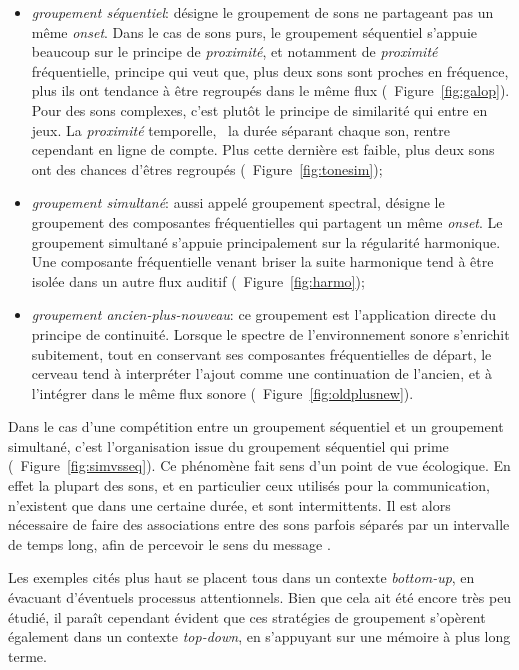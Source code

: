 {\begin{itemize}
\item \emph{groupement séquentiel}: désigne le groupement de sons ne partageant pas un même \emph{onset}. Dans le cas de sons purs, le groupement séquentiel s'appuie beaucoup sur le principe de \emph{proximité}, et notamment de \emph{proximité} fréquentielle, principe qui veut que, plus deux sons sont proches en fréquence, plus ils ont tendance à être regroupés dans le même flux (\cf~Figure~\ref{fig:galop}). Pour des sons complexes, c'est plutôt le principe de similarité qui entre en jeux. La \emph{proximité} temporelle, \ie~la durée séparant chaque son, rentre cependant en ligne de compte. Plus cette dernière est faible, plus deux sons ont des chances d'êtres regroupés (\cf~Figure~\ref{fig:tonesim});
\item \emph{groupement simultané}: aussi appelé groupement spectral, désigne le groupement des composantes fréquentielles qui partagent un même \emph{onset}. Le groupement simultané s'appuie principalement sur la régularité harmonique. Une composante fréquentielle venant briser la suite harmonique tend à être isolée dans un autre flux auditif (\cf~Figure~\ref{fig:harmo});
\item \emph{groupement ancien-plus-nouveau}: ce groupement est l'application directe du principe de continuité. Lorsque le spectre de l'environnement sonore s'enrichit subitement, tout en conservant ses composantes fréquentielles de départ, le cerveau tend à interpréter l'ajout comme une continuation de l'ancien, et à l'intégrer dans le même flux sonore (\cf~Figure~\ref{fig:oldplusnew}).
\end{itemize}

Dans le cas d'une compétition entre un groupement séquentiel et un groupement simultané, c'est l'organisation issue du groupement séquentiel qui prime (\cf~Figure~\ref{fig:simvsseq}). Ce phénomène fait sens d'un point de vue écologique. En effet la plupart des sons, et en particulier ceux utilisés pour la communication, n'existent que dans une certaine durée, et sont intermittents. Il est alors nécessaire de faire des associations entre des sons parfois séparés par un intervalle de temps long, afin de percevoir le sens du message \citep{winkler2009modeling}.

Les exemples cités plus haut se placent tous dans un contexte \emph{bottom-up}, en évacuant d'éventuels processus attentionnels. Bien que cela ait été encore très peu étudié, il paraît cependant évident que ces stratégies de groupement s’opèrent également dans un contexte \emph{top-down}, en s'appuyant sur une mémoire à plus long terme.


}
